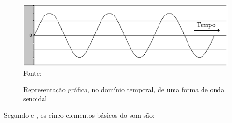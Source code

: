 \begin{figure}[!htb]
   \centering
   \caption{Representação gráfica, no domínio temporal, de uma forma de onda senoidal}\label{fig:ondaSenoidal} 
   \includegraphics[scale=0.50]{figuras/ondaSenoidal.png}
   \\Fonte: \cite{miletto2004}
\end{figure}

Segundo  e , os cinco elementos básicos do som são:
